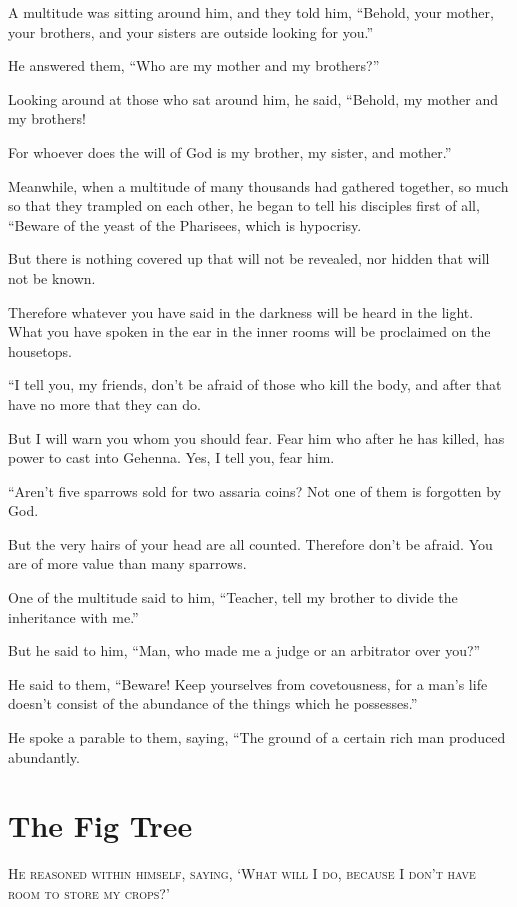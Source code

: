 A multitude was sitting around him, and they told him, “Behold, your mother, your brothers, and your sisters are outside looking for you.”

He answered them, “Who are my mother and my brothers?”

Looking around at those who sat around him, he said, “Behold, my mother and my brothers!

For whoever does the will of God is my brother, my sister, and mother.”

Meanwhile, when a multitude of many thousands had gathered together, so much so that they trampled on each other, he began to tell his disciples first of all, “Beware of the yeast of the Pharisees, which is hypocrisy.

But there is nothing covered up that will not be revealed, nor hidden that will not be known.

Therefore whatever you have said in the darkness will be heard in the light. What you have spoken in the ear in the inner rooms will be proclaimed on the housetops.

“I tell you, my friends, don’t be afraid of those who kill the body, and after that have no more that they can do.

But I will warn you whom you should fear. Fear him who after he has killed, has power to cast into Gehenna. Yes, I tell you, fear him.

“Aren’t five sparrows sold for two assaria coins? Not one of them is forgotten by God.

But the very hairs of your head are all counted. Therefore don’t be afraid. You are of more value than many sparrows.

One of the multitude said to him, “Teacher, tell my brother to divide the inheritance with me.”

But he said to him, “Man, who made me a judge or an arbitrator over you?”

He said to them, “Beware! Keep yourselves from covetousness, for a man’s life doesn’t consist of the abundance of the things which he possesses.”

He spoke a parable to them, saying, “The ground of a certain rich man produced abundantly.


\clearpage \section*{The Fig Tree}
\chapterornament

\lettrine{H}{e reasoned within himself, saying, ‘What will I do, because I don’t have room to store my crops?’}

